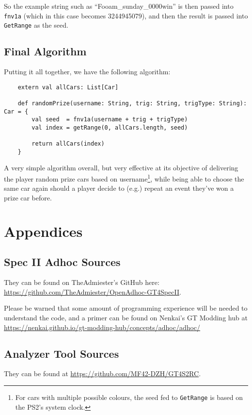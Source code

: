 \documentclass[12pt,a4paper,notitlepage]{extarticle}
\begin{document}
            \noindent So the example string such as ``Fooam\_sunday\_0000win'' is then passed
            into \texttt{fnv1a} (which in this case becomes 3244945079), and then the result is
            passed into \texttt{GetRange} as the seed.

        \subsection*{Final Algorithm}
            Putting it all together, we have the following algorithm:

            \begin{lstlisting}
    extern val allCars: List[Car]

    def randomPrize(username: String, trig: String, trigType: String): Car = {
        val seed  = fnv1a(username + trig + trigType)
        val index = getRange(0, allCars.length, seed)

        return allCars(index)
    }
            \end{lstlisting}

            \noindent A very simple algorithm overall, but very effective at its objective of
            delivering the player random prize cars based on username\footnote{For cars with
            multiple possible colours, the seed fed to \texttt{GetRange} is based on the PS2's
            system clock.}, while being able to choose the same car again should a player
            decide to (e.g.) repeat an event they've won a prize car before.

    \section*{Appendices}
        \subsection*{Spec II Adhoc Sources}
            They can be found on TheAdmiester's GitHub here:
            \url{https://github.com/TheAdmiester/OpenAdhoc-GT4SpecII}.

            Please be warned that some amount of programming experience will be needed to
            understand the code, and a primer can be found on Nenkai's GT Modding hub at
            \url{https://nenkai.github.io/gt-modding-hub/concepts/adhoc/adhoc/}

        \subsection*{Analyzer Tool Sources}
            They can be found at \url{https://github.com/MF42-DZH/GT4S2RC}.
\end{document}
